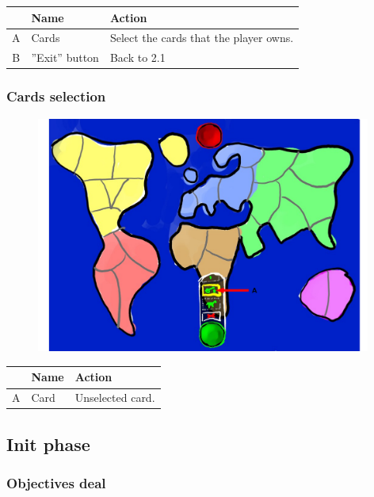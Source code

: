\documentclass[12pt,a4paper]{article}
\begin{document}
\begin{table}[H]
\small
\centering
\begin{tabular}{c|p{5cm}|p{7cm}}
& Name & Action \\ \hline\hline
A
&Cards
&Select the cards that the player owns.
\\B
&''Exit'' button
&Back to 2.1
\end{tabular}
\end{table}

\newpage
\subsubsection{Cards selection}

\begin{figure}[H]
  \centering
  \includegraphics[width=11cm]{pic/mocks/2-4.pdf}
\end{figure}

\begin{table}[H]
\small
\centering
\begin{tabular}{c|p{5cm}|p{7cm}}
& Name & Action \\ \hline\hline
A
&Card
&Unselected card.
\end{tabular}
\end{table}


\subsection{Init phase}

\subsubsection{Objectives deal}
\end{document}
